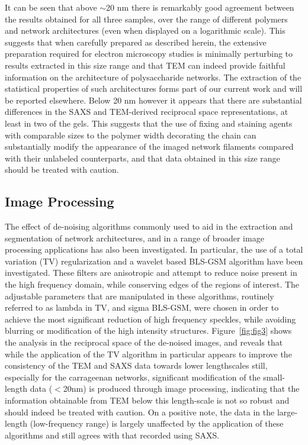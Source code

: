 It can be seen that above $\sim$20 nm there is remarkably good agreement between the results obtained for all three samples, over the range of different polymers and network architectures (even when displayed on a logarithmic scale). This suggests that when carefully prepared as described herein, the extensive preparation required for electron microscopy studies is minimally perturbing to results extracted in this size range and that TEM can indeed provide faithful information on the architecture of polysaccharide networks. The extraction of the statistical properties of such architectures forms part of our current work and will be reported elsewhere. Below 20 nm however it appears that there are substantial differences in the SAXS and TEM-derived reciprocal space representations, at least in two of the gels. This suggests that the use of fixing and staining agents with comparable sizes to the polymer width decorating the chain can substantially modify the appearance of the imaged  network filaments compared with their unlabeled counterparts, and that data obtained in this size range should be treated with caution.


\subsection{Image Processing}
The effect of de-noising algorithms commonly used to aid in the extraction and segmentation of network architectures, and in a range of broader image processing applications has also been investigated. In particular, the use of a total variation (TV) regularization \cite{barbero_fast_2011, barbero_modular_2014} and a wavelet based BLS-GSM algorithm \cite{portilla_image_2003, rajaei_analysis_2014, hernandez-cerdan_isotropic_2017} have been investigated. These filters are anisotropic and attempt to reduce noise present in the high frequency domain, while conserving edges of the regions of interest. The adjustable parameters that are manipulated in these algorithms, routinely referred to as lambda in TV, and sigma BLS-GSM, were chosen in order to achieve the most significant reduction of high frequency speckles, while avoiding blurring or modification of the high intensity structures.
Figure~\ref{fig:fig3} shows the analysis in the reciprocal space of the de-noised images, and reveals that while the application of the TV algorithm in particular appears to improve the consistency of the TEM and SAXS data towards lower lengthscales still, especially for the carrageenan networks, significant modification of the small-length data ($<$20\si{\nm}) is produced through image processing, indicating that the information obtainable from TEM below this length-scale is not so robust and should indeed be treated with caution. On a positive note, the data in the large-length (low-frequency range) is largely unaffected by the application of these algorithms and still agrees with that recorded using SAXS.

